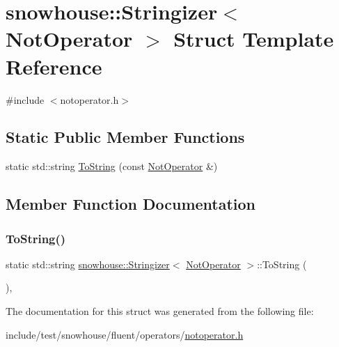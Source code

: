 \hypertarget{structsnowhouse_1_1Stringizer_3_01NotOperator_01_4}{}\section{snowhouse\+::Stringizer$<$ Not\+Operator $>$ Struct Template Reference}
\label{structsnowhouse_1_1Stringizer_3_01NotOperator_01_4}


{\ttfamily \#include $<$notoperator.\+h$>$}

\subsection*{Static Public Member Functions}
\begin{DoxyCompactItemize}
\item 
static std\+::string \mbox{\hyperlink{structsnowhouse_1_1Stringizer_3_01NotOperator_01_4_a4e9e3ab61a96cc4e9883fd51ede4529c}{To\+String}} (const \mbox{\hyperlink{structsnowhouse_1_1NotOperator}{Not\+Operator}} \&)
\end{DoxyCompactItemize}


\subsection{Member Function Documentation}
\mbox{\label{structsnowhouse_1_1Stringizer_3_01NotOperator_01_4_a4e9e3ab61a96cc4e9883fd51ede4529c}} 
\subsubsection{\texorpdfstring{ToString()}{ToString()}}
{\footnotesize\ttfamily static std\+::string \mbox{\hyperlink{structsnowhouse_1_1Stringizer}{snowhouse\+::\+Stringizer}}$<$ \mbox{\hyperlink{structsnowhouse_1_1NotOperator}{Not\+Operator}} $>$\+::To\+String (\begin{DoxyParamCaption}\item[{const \mbox{\hyperlink{structsnowhouse_1_1NotOperator}{Not\+Operator}} \&}]{ }\end{DoxyParamCaption})\hspace{0.3cm}{\ttfamily [inline]}, {\ttfamily [static]}}



The documentation for this struct was generated from the following file\+:\begin{DoxyCompactItemize}
\item 
include/test/snowhouse/fluent/operators/\mbox{\hyperlink{notoperator_8h}{notoperator.\+h}}\end{DoxyCompactItemize}
